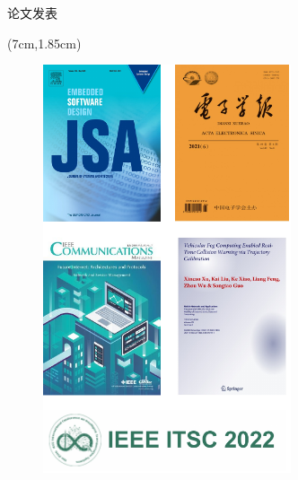 \begin{frame}{论文发表}
\begin{center}
\begin{textblock*}{\textwidth}
\begin{minipage}[t]{0.83\textwidth}
\end{minipage}
\end{textblock*}
\end{center}
\begin{center}
\begin{textblock*}{\textwidth}(7cm,1.85cm)
\begin{minipage}[t]{0.4\textwidth}
\begin{figure}
  \centering
  \includegraphics[width=0.65\textwidth]{fig/publication1.pdf}
\end{figure}
\end{minipage}
\end{textblock*}
\end{center}
\end{frame}

